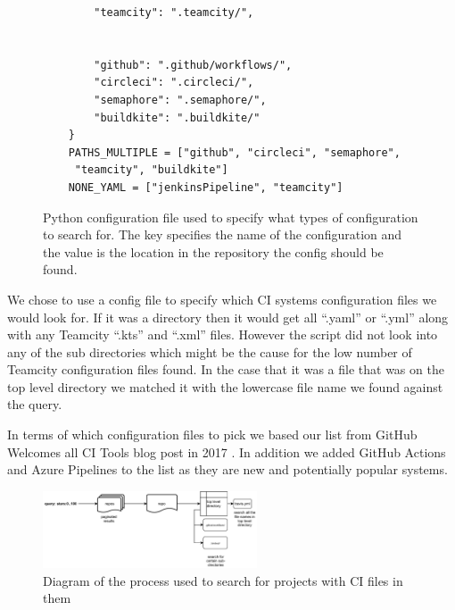\documentclass[10pt,conference]{IEEEtran}
\begin{document}
\begin{figure}[!htbp]
\begin{minipage}{.48\textwidth}
\begin{verbatim}
        "teamcity": ".teamcity/",
    
    
        "github": ".github/workflows/",
        "circleci": ".circleci/",
        "semaphore": ".semaphore/",
        "buildkite": ".buildkite/"
    }
    PATHS_MULTIPLE = ["github", "circleci", "semaphore",
     "teamcity", "buildkite"]
    NONE_YAML = ["jenkinsPipeline", "teamcity"]
    \end{verbatim}
    \caption{Python configuration file used to specify what types of configuration to search for. The key specifies the name of the configuration and the value is the location in the repository the config should be found.}
  \end{minipage}
\end{figure}

We chose to use a config file to specify which CI systems configuration files we would look for. If it was a directory then it would get all \enquote{.yaml} or \enquote{.yml} along with any Teamcity \enquote{.kts} and \enquote{.xml} files. However the script did not look into any of the sub directories which might be the cause for the low number of Teamcity configuration files found. In the case that it was a file that was on the top level directory we matched it with the lowercase file name we found against the query.

In terms of which configuration files to pick we based our list from GitHub Welcomes all CI Tools blog post in 2017 \cite{Github2017}. In addition we added GitHub Actions and Azure Pipelines to the list as they are new and potentially popular systems. 



\begin{figure}[!t]
  \centering
  \includegraphics[width=2.5in]{methadology diagram.pdf}
  
  \caption[alt text]{Diagram of the process used to search for projects with CI files in them}
  \label{image_methadolgoy_diagram}
\end{figure}
\end{document}
